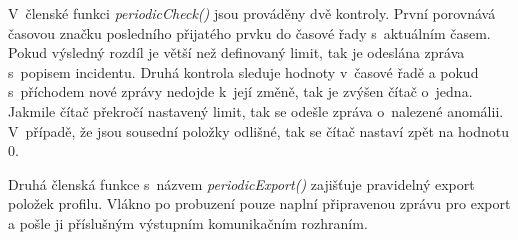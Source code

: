 \begin{itemize}
 V~členské funkci \textit{periodicCheck()} jsou prováděny dvě kontroly. První porovnává
 časovou značku posledního přijatého prvku do časové řady s~aktuálním časem. Pokud výsledný rozdíl je větší
 než definovaný limit, tak je odeslána zpráva s~popisem incidentu. Druhá kontrola sleduje hodnoty
 v~časové řadě a pokud s~příchodem nové zprávy nedojde k~její změně, tak je zvýšen čítač o~jedna. 
 Jakmile čítač překročí nastavený limit, tak se odešle zpráva o~nalezené anomálii. V~případě,
 že jsou sousední položky odlišné, tak se čítač nastaví zpět na hodnotu 0.
 
 Druhá členská funkce s~názvem \textit{periodicExport()} zajišťuje pravidelný export položek profilu.
 Vlákno po probuzení pouze naplní připravenou zprávu pro export a pošle ji příslušným výstupním
 komunikačním rozhraním.
 
\end{itemize}